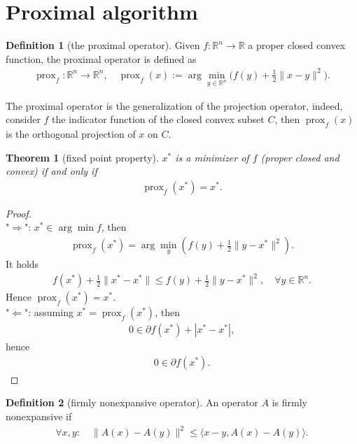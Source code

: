 \documentclass[a4paper,11pt,fleqn, draft]{book}
\newtheorem{theorem}{Theorem}[section]
\theoremstyle{definition}
\newtheorem{definition}{Definition}[section]
\theoremstyle{remark}
\DeclareMathOperator*{\prox}{prox}
\begin{document}
\section{Proximal algorithm}
\begin{definition}[the proximal operator]
	Given $f:\mathbb{R}^n \rightarrow \mathbb{R}$ a proper closed convex function, the proximal operator is defined as
	\begin{align*}
		\prox_f: \mathbb{R}^n \rightarrow \mathbb{R}^n, \quad \prox_f(x):= \arg\min_{y \in \mathbb{R}^n} \bigg(f(y) + \frac{1}{2}\|x - y\|^2 \bigg). 
	\end{align*}
\end{definition}

The proximal operator is the generalization of the projection operator, indeed, consider $f$ the indicator function of the closed convex subset $C$, then $\prox_f(x)$ is the orthogonal projection of $x$ on $C$.  

\begin{theorem}[fixed point property]
	$x^*$ is a minimizer of $f$ (proper closed and convex) if and only if 
	\begin{align*}
		\prox_f(x^*) = x^*.
	\end{align*}
\end{theorem}
\begin{proof}
	\quad\\
	"$\Rightarrow$": $x^* \in \arg\min f$, then 
	\begin{align*}
		\prox_f(x^*) = \arg\min_y( f(y) + \frac{1}{2} \|y - x^*\|^2 ).
	\end{align*}
	It holds
	\begin{align*}
		f(x^*) + \frac{1}{2}\|x^* - x^*\| \le f(y) + \frac{1}{2}\|y - x^*\|^2 , \quad \forall y \in \mathbb{R}^n.
	\end{align*}
	Hence $\prox_f(x^*) = x^*$. \\
	"$\Leftarrow$": assuming $x^* = \prox_f(x^*)$, then 
	\begin{align*}
		0 \in \partial f(x^*) + |x^* - x^*|, 
	\end{align*} 
	hence
	\begin{align*}
		0 \in \partial f(x^*). 
	\end{align*}
\end{proof}

\begin{definition}[firmly nonexpansive operator]
	An operator $A$ is firmly nonexpansive if 
	\begin{align*}
		\forall x, y: \quad \|A(x) - A(y)\|^2 \le \langle x - y, A(x) - A(y) \rangle. 
	\end{align*}
\end{definition}
\end{document}
